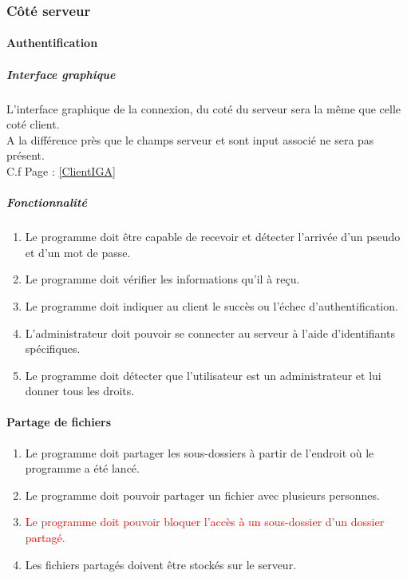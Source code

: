 \documentclass[10pt,a4paper]{report}
\begin{document}
\subsubsection{Côté serveur}
\paragraph{Authentification}
	
	\subparagraph{Interface graphique}
		L'interface graphique de la connexion, du coté du serveur sera la même que celle coté client.\\
		A la différence près que le champs serveur et sont input associé ne sera pas présent.\\
		C.f Page \pageref{ClientIGA} : \ref{ClientIGA}
	\subparagraph{Fonctionnalité}
	\begin{enumerate}
		\item Le programme doit être capable de recevoir et détecter l'arrivée d'un pseudo et d'un mot de passe.
		\item Le programme doit vérifier les informations qu'il à reçu.
		\item Le programme doit indiquer au client le succès ou l'échec d'authentification.
		\item L'administrateur doit pouvoir se connecter au serveur à l'aide d'identifiants spécifiques.
		\item Le programme doit détecter que l'utilisateur est un administrateur et lui donner tous les droits.	
	\end{enumerate}
	
\paragraph{Partage de fichiers}
	\begin{enumerate}
		\item Le programme doit partager les sous-dossiers à partir de l'endroit où le programme a été lancé.
		\item Le programme doit pouvoir partager un fichier avec plusieurs personnes.
		\item \textcolor{red}{Le programme doit pouvoir bloquer l'accès à un sous-dossier d'un dossier partagé. }
		\item Les fichiers partagés doivent être stockés sur le serveur.
	\end{enumerate}
	
\end{document}
